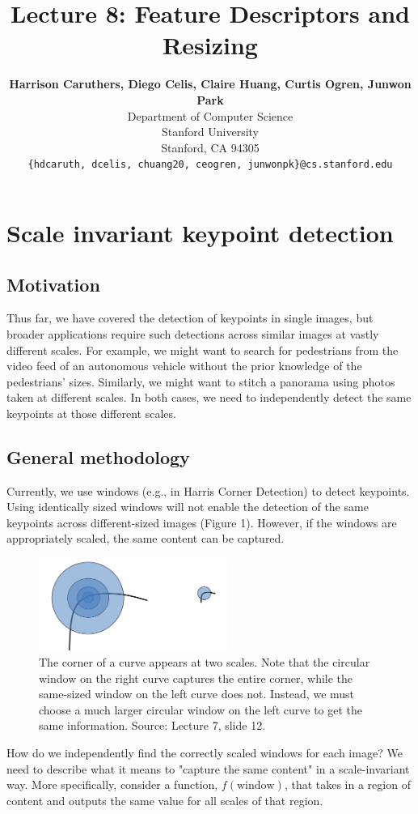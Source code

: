 \documentclass{article}
\title{Lecture 8: Feature Descriptors and Resizing}
\author{
  \textbf{Harrison Caruthers, Diego Celis, Claire Huang, Curtis Ogren, Junwon Park} \\
  Department of Computer Science\\
  Stanford University\\
  Stanford, CA 94305 \\
  \texttt{\{hdcaruth, dcelis, chuang20, ceogren, junwonpk\}@cs.stanford.edu} \\
}
\begin{document}
\maketitle

\section{Scale invariant keypoint detection}
\subsection{Motivation}
Thus far, we have covered the detection of keypoints in single images, but broader applications require such detections across similar images at vastly different scales. For example, we might want to search for pedestrians from the video feed of an autonomous vehicle without the prior knowledge of the pedestrians' sizes. Similarly, we might want to stitch a panorama using photos taken at different scales. In both cases, we need to independently detect the same keypoints at those different scales.

\subsection{General methodology}
Currently, we use windows (e.g., in Harris Corner Detection) to detect keypoints. Using identically sized windows will not enable the detection of the same keypoints across different-sized images (Figure 1). However, if the windows are appropriately scaled, the same content can be captured.

\begin{figure}[h]
  \centering
  \includegraphics[width=0.55\textwidth]{corners}
  \caption{The corner of a curve appears at two scales. Note that the circular window on the right curve captures the entire corner, while the same-sized window on the left curve does not. Instead, we must choose a much larger circular window on the left curve to get the same information. Source: Lecture 7, slide 12.}
\end{figure}

How do we independently find the correctly scaled windows for each image? We need to describe what it means to "capture the same content" in a scale-invariant way. More specifically, consider a function, $f(\text{window})$, that takes in a region of content and outputs the same value for all scales of that region.
\end{document}
